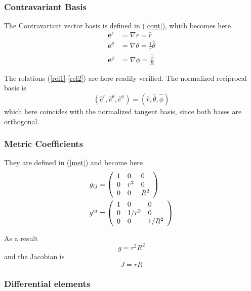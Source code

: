\subsubsection{Contravariant Basis}

The Contravariant vector basis is defined in (\ref{cont}), which becomes
here 
\begin{align}
\mathbf{e}^{r} & =\nabla r=\widehat{r} \\
\mathbf{e}^{\theta} & =\nabla\theta=\frac{1}{r}\widehat{\theta} \\
\mathbf{e}^{\phi} & =\nabla\phi=\frac{\widehat{\phi}}{R}
\end{align}

The relations (\ref{rel1}-\ref{rel2}) are here readily verified. The
normalized reciprocal basis is 
\begin{equation}
\left( \widehat{e}^{r},\widehat{e}^{\theta},\widehat{e}^{\phi}\right)
=\left( \widehat{r},\widehat{\theta},\widehat{\phi}\right)
\end{equation}
which here coincides with the normalized tangent basis, since both bases are
orthogonal.

\subsubsection{Metric Coefficients}

They are defined in (\ref{met}) and become here 
\begin{align}
g_{ij} & =\left( 
\begin{array}{lll}
1 & 0 & 0 \\ 
0 & r^{2} & 0 \\ 
0 & 0 & R^{2}%
\end{array}
\right)  \label{gijrtheta} \\
g^{ij} & =\left( 
\begin{array}{lll}
1 & 0 & 0 \\ 
0 & 1/r^{2} & 0 \\ 
0 & 0 & 1/R^{2}%
\end{array}
\right)  \notag
\end{align}

As a result 
\begin{equation}
g=r^{2}R^{2}
\end{equation}
and the Jacobian is 
\begin{equation}
J=rR
\end{equation}

\subsubsection{Differential elements}

